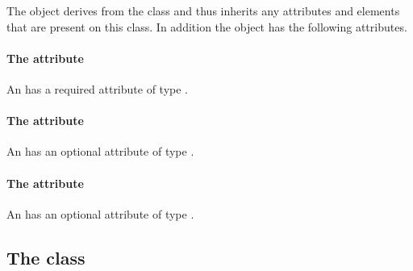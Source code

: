 


The \InteriorPoint object derives from the \SBase class and thus
inherits any attributes and elements that are present on this class.
In addition the \InteriorPoint object has the following attributes.

\paragraph{The \fixttspace{} attribute}

An \InteriorPoint has a required attribute  of type
.


\paragraph{The \fixttspace{} attribute}

An \InteriorPoint has an optional attribute  of type
.


\paragraph{The \fixttspace{} attribute}

An \InteriorPoint has an optional attribute  of type
.


\subsection{The  class}
\label{boundary-class}



